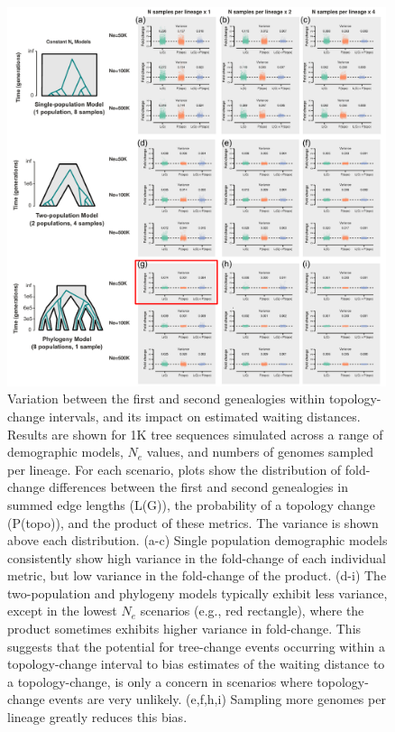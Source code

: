 \documentclass[11pt]{article}
\begin{document}
\begin{figure}[p]
	\centering
	\includegraphics[width=0.99\textwidth]{figures/current/FigS-bias-fold-topo-first-2.pdf}
	\caption{
		Variation between the first and second genealogies within topology-change 
		intervals, and its impact on estimated waiting distances.
		Results are shown for 1K tree sequences simulated across a range of 
		demographic models, $N_e$ values, and numbers of genomes sampled per lineage.
		For each scenario, plots show the distribution of fold-change differences
		between the first and second genealogies in summed edge lengths (L(G)),
		the probability of a topology change (P(topo)), and the product of these
		metrics. The variance is shown above each distribution.
		(a-c) Single population demographic models consistently show high variance
		in the fold-change of each individual metric, but low variance in the
		fold-change of the product.
		(d-i) The two-population and phylogeny models typically exhibit less 
		variance, except in the lowest $N_e$ scenarios (e.g., red rectangle),
		where the product sometimes exhibits higher variance in fold-change.
		This suggests that the potential for tree-change events occurring within a 
		topology-change interval to bias estimates of the waiting distance to a
		topology-change, is only a concern in scenarios where topology-change events
		are very unlikely. (e,f,h,i) Sampling more genomes per lineage greatly 
		reduces this bias.
	}
     \label{fig:figS-bias-topo-first}
\end{figure}
\end{document}
